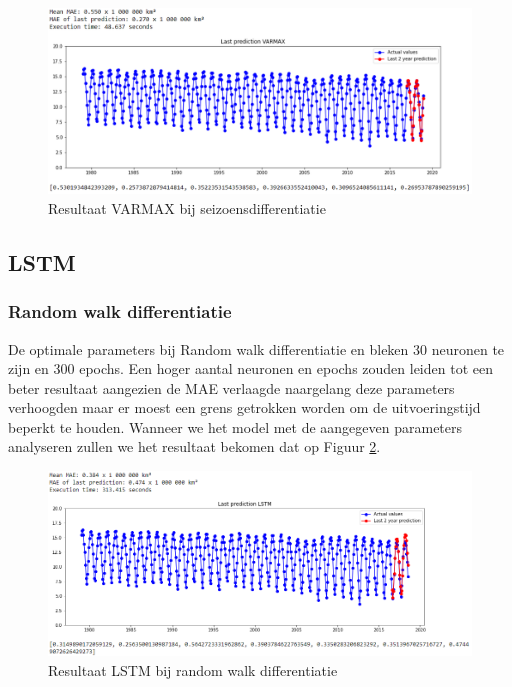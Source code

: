 \begin{figure}
    \centering
    \caption{Resultaat VARMAX bij seizoensdifferentiatie}
    \label{fig:mvsvarmaxsdiff}
    \includegraphics[width=1\linewidth]{mv_s_varmax_s_diff}
\end{figure}


\subsection{LSTM}
\subsubsection{Random walk differentiatie}
De optimale parameters bij Random walk differentiatie en bleken 30 neuronen te zijn en 300 epochs. Een hoger aantal neuronen en epochs zouden leiden tot een beter resultaat aangezien de MAE verlaagde naargelang deze parameters verhoogden maar er moest een grens getrokken worden om de uitvoeringstijd beperkt te houden. Wanneer we het model met de aangegeven parameters analyseren zullen we het resultaat bekomen dat op Figuur \ref{fig:mvslstmdiff}.

\begin{figure}
    \centering
    \caption{Resultaat LSTM bij random walk differentiatie}
    \label{fig:mvslstmdiff}
    \includegraphics[width=1\linewidth]{mv_s_lstm_diff}
\end{figure}


